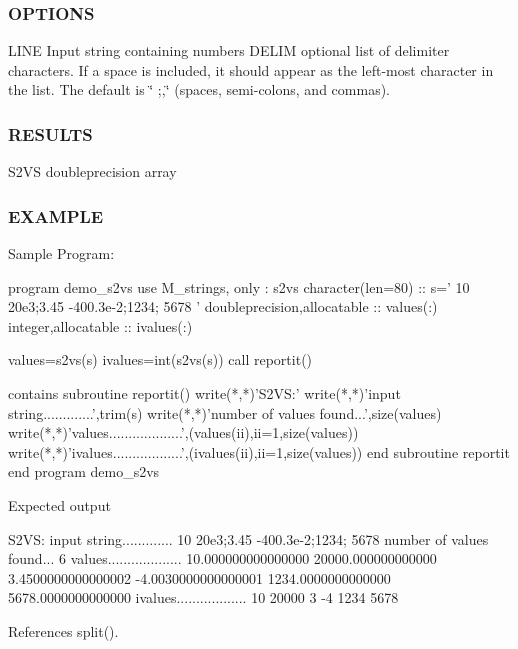 \subsubsection*{O\+P\+T\+I\+O\+NS}

L\+I\+NE Input string containing numbers D\+E\+L\+IM optional list of delimiter characters. If a space is included, it should appear as the left-\/most character in the list. The default is \char`\"{} ;,\char`\"{} (spaces, semi-\/colons, and commas). \subsubsection*{R\+E\+S\+U\+L\+TS}

S2\+VS doubleprecision array

\subsubsection*{E\+X\+A\+M\+P\+LE}

\begin{DoxyVerb} Sample Program:

  program demo_s2vs
  use M_strings, only : s2vs
  character(len=80)           :: s=' 10 20e3;3.45 -400.3e-2;1234; 5678 '
  doubleprecision,allocatable :: values(:)
  integer,allocatable         :: ivalues(:)

  values=s2vs(s)
  ivalues=int(s2vs(s))
  call reportit()

  contains
    subroutine reportit()
      write(*,*)'S2VS:'
      write(*,*)'input string.............',trim(s)
      write(*,*)'number of values found...',size(values)
      write(*,*)'values...................',(values(ii),ii=1,size(values))
      write(*,*)'ivalues..................',(ivalues(ii),ii=1,size(values))
    end subroutine reportit
  end program demo_s2vs

Expected output

 S2VS:
 input string............. 10 20e3;3.45 -400.3e-2;1234; 5678
 number of values found... 6
 values................... 10.000000000000000  20000.000000000000 3.4500000000000002
 -4.0030000000000001       1234.0000000000000  5678.0000000000000
 ivalues.................. 10  20000  3  -4 1234 5678 \end{DoxyVerb}
 

References split().

\mbox{\label{namespacem__strings_a3f0119fab962146c7656cad592dd9acd}} 
